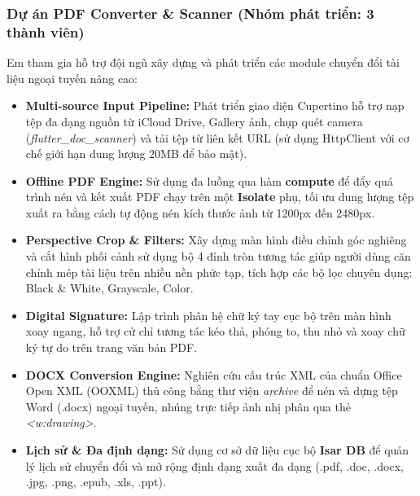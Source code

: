 \documentclass[12pt, a4paper]{article}
\begin{document}
\subsubsection{Dự án PDF Converter \& Scanner (Nhóm phát triển: 3 thành viên)}
Em tham gia hỗ trợ đội ngũ xây dựng và phát triển các module chuyển đổi tài liệu ngoại tuyến nâng cao:
\begin{itemize}
    \item \textbf{Multi-source Input Pipeline:} Phát triển giao diện Cupertino hỗ trợ nạp tệp đa dạng nguồn từ iCloud Drive, Gallery ảnh, chụp quét camera (\textit{flutter\_doc\_scanner}) và tải tệp từ liên kết URL (sử dụng HttpClient với cơ chế giới hạn dung lượng 20MB để bảo mật).
    \item \textbf{Offline PDF Engine:} Sử dụng đa luồng qua hàm \textbf{compute} để đẩy quá trình nén và kết xuất PDF chạy trên một \textbf{Isolate} phụ, tối ưu dung lượng tệp xuất ra bằng cách tự động nén kích thước ảnh từ 1200px đến 2480px.
    \item \textbf{Perspective Crop \& Filters:} Xây dựng màn hình điều chỉnh góc nghiêng và cắt hình phối cảnh sử dụng bộ 4 đỉnh tròn tương tác giúp người dùng căn chỉnh mép tài liệu trên nhiều nền phức tạp, tích hợp các bộ lọc chuyên dụng: Black \& White, Grayscale, Color.
    \item \textbf{Digital Signature:} Lập trình phân hệ chữ ký tay cục bộ trên màn hình xoay ngang, hỗ trợ cử chỉ tương tác kéo thả, phóng to, thu nhỏ và xoay chữ ký tự do trên trang văn bản PDF.
    \item \textbf{DOCX Conversion Engine:} Nghiên cứu cấu trúc XML của chuẩn Office Open XML (OOXML) thủ công bằng thư viện \textit{archive} để nén và dựng tệp Word (.docx) ngoại tuyến, nhúng trực tiếp ảnh nhị phân qua thẻ \textit{<w:drawing>}.
    \item \textbf{Lịch sử \& Đa định dạng:} Sử dụng cơ sở dữ liệu cục bộ \textbf{Isar DB} để quản lý lịch sử chuyển đổi và mở rộng định dạng xuất đa dạng (.pdf, .doc, .docx, .jpg, .png, .epub, .xls, .ppt).
\end{itemize}
\end{document}
